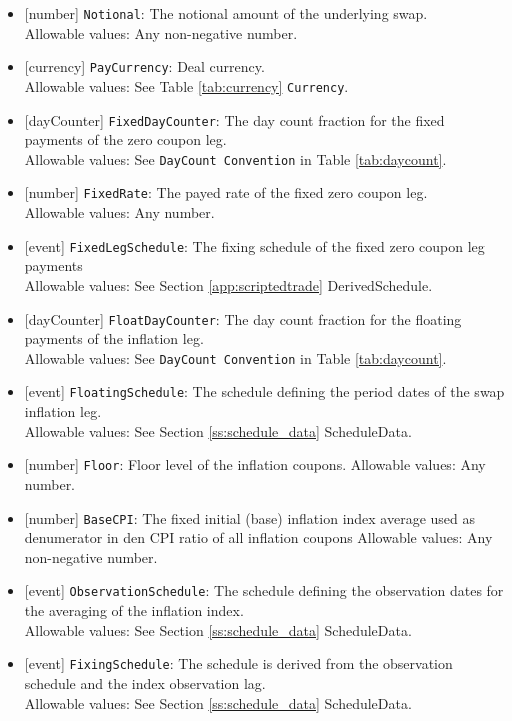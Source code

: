 \begin{itemize}
  \item{}[number] \lstinline!Notional!: The notional amount of the underlying swap. \\
  Allowable values: Any non-negative number.
  \item{}[currency] \lstinline!PayCurrency!: Deal currency. \\
  Allowable values: See Table \ref{tab:currency} \lstinline!Currency!.
  \item{}[dayCounter] \lstinline!FixedDayCounter!: The day count fraction for the fixed payments of the zero coupon leg. \\
  Allowable values: See \lstinline!DayCount Convention! in Table \ref{tab:daycount}.
  \item{}[number] \lstinline!FixedRate!: The payed rate of the fixed zero coupon leg. \\
  Allowable values: Any number.
  \item{}[event] \lstinline!FixedLegSchedule!: The fixing schedule of the fixed zero coupon leg payments\\
  Allowable values: See Section \ref{app:scriptedtrade} DerivedSchedule.
  \item{}[dayCounter] \lstinline!FloatDayCounter!: The day count fraction for the floating payments of the inflation leg. \\
  Allowable values: See \lstinline!DayCount Convention! in Table \ref{tab:daycount}.
  \item{}[event] \lstinline!FloatingSchedule!: The schedule defining the period dates of the swap inflation leg. \\
  Allowable values: See Section \ref{ss:schedule_data} ScheduleData.
  \item{}[number] \lstinline!Floor!: Floor level of the inflation coupons.
  Allowable values: Any number.
  \item{}[number] \lstinline!BaseCPI!: The fixed initial (base) inflation index average used as denumerator in den CPI ratio of all inflation coupons
  Allowable values: Any non-negative number.
  \item{}[event] \lstinline!ObservationSchedule!: The schedule defining the observation dates for the averaging of the inflation index.\\
  Allowable values: See Section \ref{ss:schedule_data} ScheduleData.
  \item{}[event] \lstinline!FixingSchedule!: The schedule is derived from the observation schedule and the index observation lag.\\
  Allowable values: See Section \ref{ss:schedule_data} ScheduleData.

\end{itemize}

